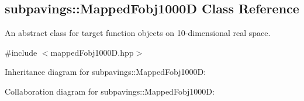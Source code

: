 \hypertarget{classsubpavings_1_1MappedFobj1000D}{\subsection{subpavings\-:\-:\-Mapped\-Fobj1000\-D \-Class \-Reference}
\label{classsubpavings_1_1MappedFobj1000D}
}


\-An abstract class for target function objects on 10-\/dimensional real space.  




{\ttfamily \#include $<$mapped\-Fobj1000\-D.\-hpp$>$}



\-Inheritance diagram for subpavings\-:\-:\-Mapped\-Fobj1000\-D\-:


\-Collaboration diagram for subpavings\-:\-:\-Mapped\-Fobj1000\-D\-:

